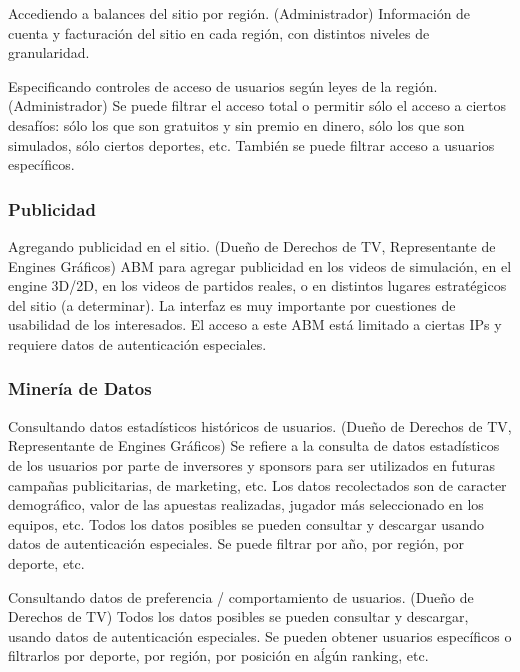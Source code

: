 {Accediendo a balances del sitio por región. (Administrador)}
{Información de cuenta y facturación del sitio en cada región, con distintos niveles de granularidad.}

{Especificando controles de acceso de usuarios según leyes de la región. (Administrador)}
{Se puede filtrar el acceso total o permitir sólo el acceso a ciertos desafíos: sólo los que son gratuitos y sin premio en dinero, sólo los que son simulados, sólo ciertos deportes, etc. También se puede filtrar acceso a usuarios específicos.}

\subsubsection{Publicidad}

{Agregando publicidad en el sitio. (Dueño de Derechos de TV, Representante de Engines Gráficos)}
{ABM para agregar publicidad en los videos de simulación, en el engine 3D/2D, en los videos de partidos reales, o en distintos lugares estratégicos del sitio (a determinar). La interfaz es muy importante por cuestiones de usabilidad de los interesados. El acceso a este ABM está limitado a ciertas IPs y requiere datos de autenticación especiales.}


\subsubsection{Minería de Datos}

{Consultando datos estadísticos históricos de usuarios. (Dueño de Derechos de TV, Representante de Engines Gráficos)}
{Se refiere a la consulta de datos estadísticos de los usuarios por parte de inversores y sponsors para ser utilizados en futuras campañas publicitarias, de marketing, etc. Los datos recolectados son de caracter demográfico, valor de las apuestas realizadas, jugador más seleccionado en los equipos, etc.
Todos los datos posibles se pueden consultar y descargar usando datos de autenticación especiales. Se puede filtrar por año, por región, por deporte, etc.}

{Consultando datos de preferencia / comportamiento de usuarios. (Dueño de Derechos de TV)}
{Todos los datos posibles se pueden consultar y descargar, usando datos de autenticación especiales. Se pueden obtener usuarios específicos o filtrarlos por deporte, por región, por posición en aĺgún ranking, etc.}